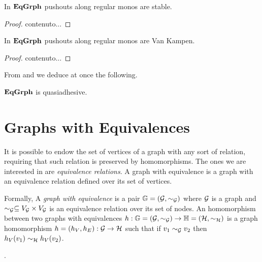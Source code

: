 \begin{lemma}\label{lem:stab}
In $\mathbf{EqGrph}$ pushouts along regular monos are stable.
\end{lemma}
\begin{proof}
	contenuto...
\end{proof}

\begin{lemma}\label{lem:vk}
In $\mathbf{EqGrph}$ pushouts along regular monos are Van Kampen.
\end{lemma}
\begin{proof}
	contenuto...
\end{proof}

From  and  we deduce at once the following.

\begin{cor}\label{cor:equi}
	$\mathbf{EqGrph}$ is quasiadhesive.
\end{cor}




\color{black}
\section{Graphs with Equivalences}

It is possible to endow the set of vertices of a graph with any sort of relation, requiring that such relation is preserved by homomorphisms. The ones we are interested in are \emph{equivalence relations}.
A graph with equivalence is a graph with an equivalence relation defined over its set of vertices.

Formally,  A \emph{graph with equivalence} is a pair $\mathbb{G} = (\mathcal{G}, \sim_{\mathcal{G}})$ where $\mathcal{G}$ is a graph and $\sim_{\mathcal{G}} \subseteq V_{\mathcal{G}}\times V_{\mathcal{G}}$ is an equivalence relation over its set of nodes. An homomorphism between two graphs with equivalences $h :\mathbb{G} = (\mathcal{G}, \sim_{\mathcal{G}})\rightarrow \mathbb{H} = (\mathcal{H}, \sim_{\mathcal{H}})$ is a graph homomorphism $h = (h_V, h_E):\mathcal{G} \rightarrow \mathcal{H}$ such that if $v_1 \sim_{\mathcal{G}} v_2$ then $h_V(v_1) \sim_{\mathcal{H}} h_V(v_2)$.

.

